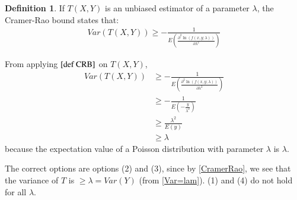 \documentclass[twocolumn]{article}
\providecommand{\brak}[1]{\ensuremath{\left(#1\right)}}
\theoremstyle{remark}
\theoremstyle{definition}
\newtheorem{definition}{Definition}[section]
\numberwithin{equation}{subsection}
\begin{document}
\begin{definition} \label{def CRB}
If $T(X, Y)$ is an unbiased estimator of a parameter $\lambda$, the Cramer-Rao bound states that:
\begin{align}
    Var\brak{T\brak{X,Y}}\geq -\frac{1}{E\brak{\frac{\partial^2 \ln(f(x,y;\lambda))}{\partial\lambda^2}}}
\end{align}
\end{definition}

From applying $\ref{def CRB}$ on $T(X,Y)$,
\begin{align}
    Var(T(X, Y))&\geq -\frac{1}{E\brak{\frac{\partial^2 \ln(f(x,y;\lambda))}{\partial\lambda^2}}}\\
    &\geq-\frac{1}{E\brak{-\frac{y}{\lambda^2}}}\\
    &\geq\frac{\lambda^2}{E\brak{y}}\\
    &\geq \lambda \label{CramerRao}
\end{align}
because the expectation value of a Poisson distribution with parameter $\lambda$ is $\lambda$.

The correct options are options (2) and (3), since by \eqref{CramerRao}, we see that the variance of $T$ is $\geq \lambda=Var(Y)$ (from \eqref{Var=lam}). (1) and (4) do not hold for all $\lambda$.
\end{document}
